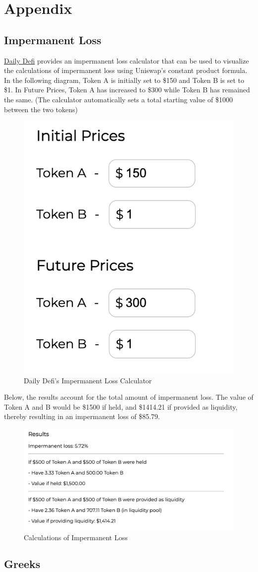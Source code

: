 \documentclass[12pt]{article}
\begin{document}
\section*{Appendix}
\subsection{Impermanent Loss}\label{subsec:impermanent}
\href{https://dailydefi.org/tools/impermanent-loss-calculator/}{Daily Defi} provides an impermanent loss calculator that can be used to visualize the calculations of impermanent loss using Uniswap's constant product formula.
In the following diagram, Token A is initially set to \$150 and Token B is set to \$1. In Future Prices, Token A has increased to \$300 while Token B has remained the same. (The calculator automatically sets a total starting value of \$1000 between the two tokens)
\begin{figure}[H]
    \centering
    \includegraphics[width=0.4\linewidth]{impermanent_loss.png}
    \caption{Daily Defi's Impermanent Loss Calculator}
    \label{fig:impermanent_loss}
\end{figure}

Below, the results account for the total amount of impermanent loss. The value of Token A and B would be \$1500 if held, and \$1414.21 if provided as liquidity, thereby resulting in an impermanent loss of \$85.79.

\begin{figure}[H]
    \centering
    \includegraphics[width=0.6\linewidth]{results.png}
    \caption{Calculations of Impermanent Loss}
    \label{fig:calculations}
\end{figure}

\subsection{Greeks}\label{subsec:greeks}
\end{document}
